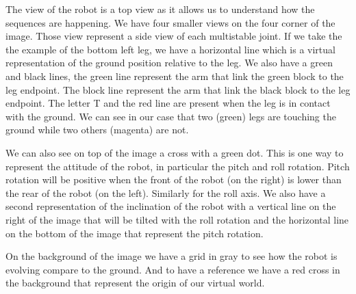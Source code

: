         The view of the robot is a top view as it allows us to understand how the sequences are happening. We have four smaller views on the four corner of the image. Those view represent a side view of each multistable joint. If we take the the example of the bottom left leg, we have a horizontal line which is a virtual representation of the ground position relative to the leg. We also have a green and black lines, the green line represent the arm that link the green block to the leg endpoint. The block line represent the arm that link the black block to the leg endpoint. The letter T and the red line are present when the leg is in contact with the ground. We can see in our case that two (green) legs are touching the ground while two others (magenta) are not.
        
        We can also see on top of the image a cross with a green dot. This is one way to represent the attitude of the robot, in particular the pitch and roll rotation. Pitch rotation will be positive when the front of the robot (on the right) is lower than the rear of the robot (on the left). Similarly for the roll axis. We also have a second representation of the inclination of the robot with a vertical line on the right of the image that will be tilted with the roll rotation and the horizontal line on the bottom of the image that represent the pitch rotation.
        
        On the background of the image we have a grid in gray to see how the robot is evolving compare to the ground. And to have a reference we have a red cross in the background that represent the origin of our virtual world. 
        
